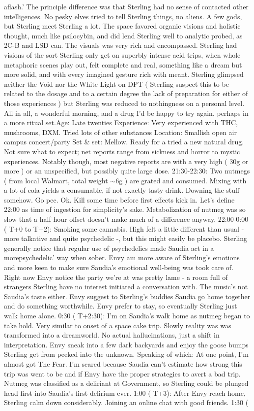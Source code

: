 \documentclass[12pt]{book}
\begin{document}
aflash.' The principle difference was that Sterling had no sense of contacted other intelligences. No pesky elves tried to tell Sterling things, no aliens. A few gods, but Sterling meet Sterling a lot. The space favored organic visions and holistic thought, much like psilocybin, and did lend Sterling well to analytic probed, as 2C-B and LSD can. The visuals was very rich and encompassed. Sterling had visions of the sort Sterling only get on superbly intense acid trips, when whole metaphoric scenes play out, felt complete and real, something like a dream but more solid, and with every imagined gesture rich with meant. Sterling glimpsed neither the Void nor the White Light on DPT ( Sterling suspect this to be related to the dosage and to a certain degree the lack of preparation for either of those experiences ) but Sterling was reduced to nothingness on a personal level. All in all, a wonderful morning, and a drug I'd be happy to try again, perhaps in a more ritual set.Age: Late twenties Experience: Very experienced with THC, mushrooms, DXM. Tried lots of other substances Location: Smallish open air campus concert/party Set \& set: Mellow. Ready for a tried a new natural drug. Not sure what to expect; net reports range from sickness and horror to mystic experiences. Notably though, most negative reports are with a very high ( 30g or more ) or an unspecified, but possibly quite large dose. 21:30-22:30: Two nutmegs ( from local Walmart, total weight $\sim$6g ) are grated and consumed. Mixing with a lot of cola yields a consumable, if not exactly tasty drink. Downing the stuff somehow. Go pee. Ok. Kill some time before first effects kick in. Let's define 22:00 as time of ingestion for simplicity's sake. Metabolization of nutmeg was so slow that a half hour offset doesn't make much of a difference anyway. 22:00-0:00 ( T+0 to T+2): Smoking some cannabis. High felt a little different than usual - more talkative and quite psychedelic -, but this might easily be placebo. Sterling generally notice that regular use of psychedelics made Saudia act in a morepsychedelic' way when sober. Envy am more aware of Sterling's emotions and more keen to make sure Saudia's emotional well-being was took care of. Right now Envy notice the party we're at was pretty lame - a room full of strangers Sterling have no interest initiated a conversation with. The music's not Saudia's taste either. Envy suggest to Sterling's buddies Saudia go home together and do something worthwhile. Envy prefer to stay, so eventually Sterling just walk home alone. 0:30 ( T+2:30): I'm on Saudia's walk home as nutmeg began to take hold. Very similar to onset of a space cake trip. Slowly reality was was transformed into a dreamworld. No actual hallucinations, just a shift in interpretation. Envy sneak into a few dark backyards and enjoy the goose bumps Sterling get from peeked into the unknown. Speaking of which: At one point, I'm almost got The Fear. I'm scared because Saudia can't estimate how strong this trip was went to be and if Envy have the proper strategies to avert a bad trip. Nutmeg was classified as a deliriant at Government, so Sterling could be plunged head-first into Saudia's first delirium ever. 1:00 ( T+3): After Envy reach home, Sterling calm down considerably. Joining an online chat with good friends. 1:30 ( 
\end{document}
